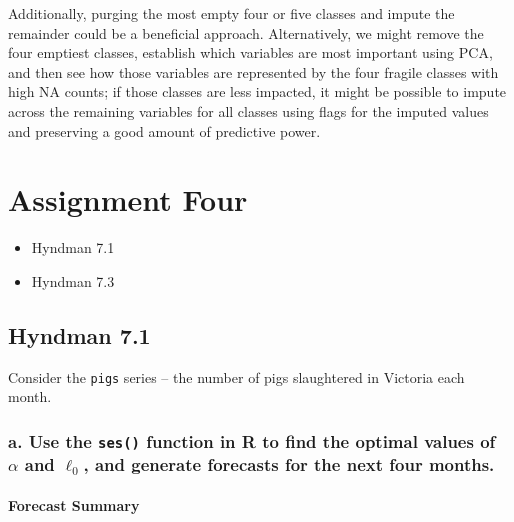 \documentclass[openany]{book}
\providecommand{\tightlist}{%
  \setlength{\itemsep}{0pt}\setlength{\parskip}{0pt}}
\renewenvironment{quote}{\begin{myquote}}{\end{myquote}}
\begin{document}
Additionally, purging the most empty four or five classes and impute the remainder could be a beneficial approach. Alternatively, we might remove the four emptiest classes, establish which variables are most important using PCA, and then see how those variables are represented by the four fragile classes with high NA counts; if those classes are less impacted, it might be possible to impute across the remaining variables for all classes using flags for the imputed values and preserving a good amount of predictive power.

\hypertarget{assignment-four}{%
\chapter{Assignment Four}\label{assignment-four}}

\begin{itemize}
\tightlist
\item
  Hyndman 7.1\\
\item
  Hyndman 7.3
\end{itemize}

\hypertarget{hyndman-7.1}{%
\section{Hyndman 7.1}\label{hyndman-7.1}}

\begin{quote}
Consider the \texttt{pigs} series -- the number of pigs slaughtered in Victoria each month.
\end{quote}

\hypertarget{a.-use-the-ses-function-in-r-to-find-the-optimal-values-of-alpha-and-ell_0-and-generate-forecasts-for-the-next-four-months.}{%
\subsection{\texorpdfstring{a. Use the \texttt{ses()} function in R to find the optimal values of \(\alpha\) and \(\ell_0\), and generate forecasts for the next four months.}{a. Use the ses() function in R to find the optimal values of \textbackslash{}alpha and \textbackslash{}ell\_0, and generate forecasts for the next four months.}}\label{a.-use-the-ses-function-in-r-to-find-the-optimal-values-of-alpha-and-ell_0-and-generate-forecasts-for-the-next-four-months.}}

\hypertarget{forecast-summary}{%
\subsubsection{Forecast Summary}\label{forecast-summary}}
\end{document}
